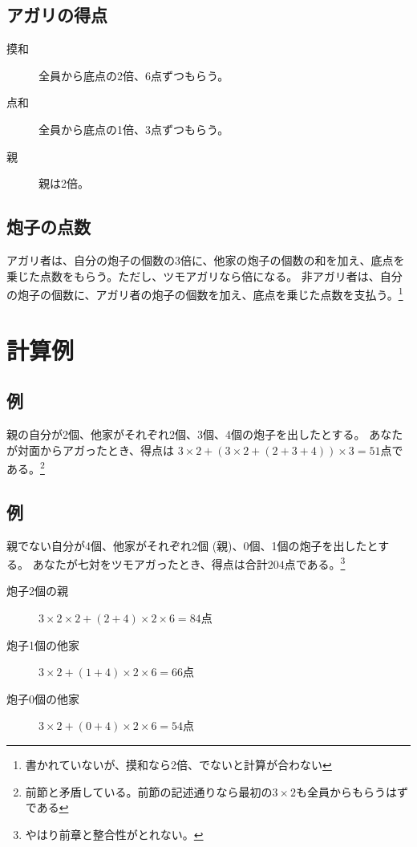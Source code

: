\documentclass{ltjsarticle}
\begin{document}
\subsection{アガリの得点}
\begin{description}
    \item[摸和] 全員から底点の2倍、6点ずつもらう。
    \item[点和] 全員から底点の1倍、3点ずつもらう。
    \item[親] 親は2倍。
\end{description}
\subsection{炮子の点数}
アガリ者は、自分の炮子の個数の3倍に、他家の炮子の個数の和を加え、底点を乗じた点数をもらう。ただし、ツモアガリなら倍になる。
非アガリ者は、自分の炮子の個数に、アガリ者の炮子の個数を加え、底点を乗じた点数を支払う。\footnote{書かれていないが、摸和なら2倍、でないと計算が合わない}
\section{計算例}
\subsection{例}
親の自分が2個、他家がそれぞれ2個、3個、4個の炮子を出したとする。
あなたが対面からアガったとき、得点は $3\times2+(3\times2+(2+3+4))\times3 = 51$点である。\footnote{前節と矛盾している。前節の記述通りなら最初の$3\times2$も全員からもらうはずである}
\subsection{例}
親でない自分が4個、他家がそれぞれ2個 (親)、0個、1個の炮子を出したとする。
あなたが七対をツモアガったとき、得点は合計$204$点である。\footnote{やはり前章と整合性がとれない。}
\begin{description}
    \item[炮子2個の親] $3\times2\times2+(2+4)\times2\times6 = 84$点
    \item[炮子1個の他家] $3\times2+(1+4)\times2\times6 = 66$点
    \item[炮子0個の他家] $3\times2+(0+4)\times2\times6 = 54$点
\end{description}
\end{document}
